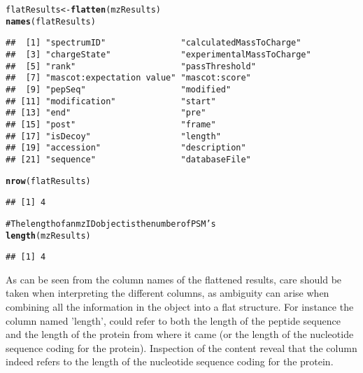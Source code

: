 \documentclass[a4paper]{article}\usepackage{graphicx, color}
\makeatletter
\newcommand{\hlfunctioncall}[1]{\textcolor[rgb]{0.501960784313725,0,0.329411764705882}{\textbf{#1}}}%
\newcommand{\hlcomment}[1]{\textcolor[rgb]{0.180392156862745,0.6,0.341176470588235}{#1}}%
\newenvironment{kframe}{%
 \def\at@end@of@kframe{}%
 \ifinner\ifhmode%
  \def\at@end@of@kframe{\end{minipage}}%
  \begin{minipage}{\columnwidth}%
 \fi\fi%
 \def\FrameCommand##1{\hskip\@totalleftmargin \hskip-\fboxsep
 \colorbox{shadecolor}{##1}\hskip-\fboxsep
     \hskip-\linewidth \hskip-\@totalleftmargin \hskip\columnwidth}%
 \MakeFramed {\advance\hsize-\width
   \@totalleftmargin\z@ \linewidth\hsize
   \@setminipage}}%
 {\par\unskip\endMakeFramed%
 \at@end@of@kframe}
\newenvironment{knitrout}{}{} %
\makeatother
\begin{document}
\begin{knitrout}
\color{fgcolor}\begin{kframe}
\begin{alltt}
flatResults <- \hlfunctioncall{flatten}(mzResults)
\hlfunctioncall{names}(flatResults)
\end{alltt}
\begin{verbatim}
##  [1] "spectrumID"               "calculatedMassToCharge"  
##  [3] "chargeState"              "experimentalMassToCharge"
##  [5] "rank"                     "passThreshold"           
##  [7] "mascot:expectation value" "mascot:score"            
##  [9] "pepSeq"                   "modified"                
## [11] "modification"             "start"                   
## [13] "end"                      "pre"                     
## [15] "post"                     "frame"                   
## [17] "isDecoy"                  "length"                  
## [19] "accession"                "description"             
## [21] "sequence"                 "databaseFile"
\end{verbatim}
\begin{alltt}
\hlfunctioncall{nrow}(flatResults)
\end{alltt}
\begin{verbatim}
## [1] 4
\end{verbatim}
\begin{alltt}

\hlcomment{# The length of an mzID object is the number of PSM's}
\hlfunctioncall{length}(mzResults)
\end{alltt}
\begin{verbatim}
## [1] 4
\end{verbatim}
\end{kframe}
\end{knitrout}

As can be seen from the column names of the flattened results, care should be taken when interpreting the different columns, as ambiguity can arise when combining all the information in the object into a flat structure. For instance the column named 'length', could refer to both the length of the peptide sequence and the length of the protein from where it came (or the length of the nucleotide sequence coding for the protein). Inspection of the content reveal that the column indeed refers to the length of the nucleotide sequence coding for the protein.
\end{document}

